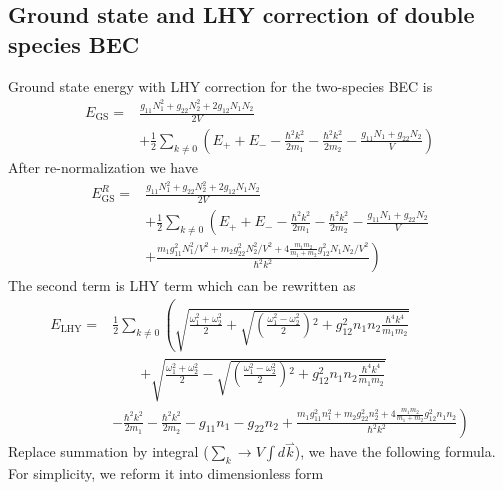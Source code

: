 \subsection{Ground state and LHY correction of double species BEC}
Ground state energy with LHY correction for the two-species BEC is
\begin{equation}
\begin{split}
E_{\text{GS}}=&\frac{g_{11}N_1^2+g_{22}N_2^2+2g_{12}N_1N_2}{2V}\\
&+\frac{1}{2}\sum _{k\neq0}\left(E_++E_--\frac{\hbar^2k^2}{2m_1}-\frac{\hbar ^2k^2}{2m_2}-\frac{g_{11}N_1+g_{22}N_2}{V}\right)
\end{split}
\end{equation}
After re-normalization we have
\begin{equation}
\begin{split}
E_{\text{GS}}^R=&\frac{g_{11}N_1^2+g_{22}N_2^2+2g_{12}N_1N_2}{2V}\\
&+\frac{1}{2}\sum _{k\neq 0} \left(E_++E_--\frac{\hbar ^2k^2}{2m_1}-\frac{\hbar^2k^2}{2m_2}-\frac{g_{11}N_1+g_{22}N_2}{V}\right.\\
&\left.+\frac{m_1g_{11}^2N_1^2/V^2+m_2g_{22}^2N_2^2/V^2+4\frac{m_1m_2}{m_1+ m_2}g_{12}^2N_1N_2/V^2}{\hbar ^2k^2}\right)
\end{split}
\end{equation}
The second term is LHY term which can be rewritten as
\begin{equation}
\begin{split}
E_{\text{LHY}}=&\frac{1}{2}\sum _{k\neq 0} \left(\sqrt{\frac{\omega _1^2+\omega _2^2}{2}+\sqrt{\left(\frac{\omega _1^2-\omega _2^2}{2}\right){}^2+g_{12}^2n_1n_2\frac{\hbar^4k^4}{m_1m_2}}}\right.\\
&\qquad\left.+\sqrt{\frac{\omega _1^2+\omega _2^2}{2}-\sqrt{\left(\frac{\omega _1^2-\omega _2^2}{2}\right){}^2+g_{12}^2n_1n_2\frac{\hbar ^4k^4}{m_1m_2}}}\right.\\
&\left.-\frac{\hbar^2k^2}{2m_1}-\frac{\hbar ^2k^2}{2m_2}-g_{11}n_1-g_{22}n_2+\frac{m_1g_{11}^2n_1^2+m_2g_{22}^2n_2^2+4\frac{m_1m_2}{m_1+ m_2}g_{12}^2n_1n_2}{\hbar ^2k^2}\right)
\end{split}
\end{equation}
Replace summation by integral ($\sum _k \to V\int d\overset{\rightharpoonup }{k}$), we have the following formula. For simplicity, we reform it into dimensionless form
